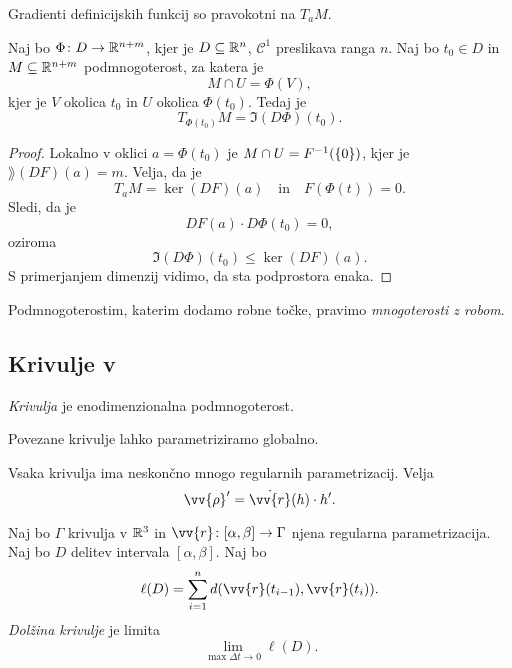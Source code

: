 \begin{opomba}
Gradienti definicijskih funkcij so pravokotni na $T_aM$.
\end{opomba}

\begin{posledica}
Naj bo $\Phi \colon D \to \mathbb{R}^{n+m}$, kjer je $D \subseteq \mathbb{R}^n$,
$\mathcal{C}^1$ preslikava ranga $n$. Naj bo $t_0 \in D$ in
$M \subseteq \mathbb{R}^{n+m}$ podmnogoterost, za katera je
\[
M \cap U = \Phi(V),
\]
kjer je $V$ okolica $t_0$ in $U$ okolica $\Phi(t_0)$. Tedaj je
\[
T_{\Phi(t_0)}M = \Im(D\Phi)(t_0).
\]
\end{posledica}

\begin{proof}
Lokalno v oklici $a = \Phi(t_0)$ je $M \cap U = F^{-1}(\left\{0\right\})$,
kjer je $\rang(DF)(a) = m$. Velja, da je
\[
T_aM = \ker(DF)(a)
\quad \text{in} \quad
F(\Phi(t)) = 0.
\]
Sledi, da je
\[
DF(a) \cdot D\Phi(t_0) = 0,
\]
oziroma
\[
\Im(D\Phi)(t_0) \leq \ker(DF)(a).
\]
S primerjanjem dimenzij vidimo, da sta podprostora enaka.
\end{proof}

\begin{opomba}
Podmnogoterostim, katerim dodamo robne točke, pravimo
\emph{mnogoterosti z robom}.
\end{opomba}

\newpage

\subsection{Krivulje v }

\begin{definicija}
\emph{Krivulja} je enodimenzionalna podmnogoterost.
\end{definicija}

\begin{trditev}
Povezane krivulje lahko parametriziramo globalno.
\end{trditev}

\begin{opomba}
Vsaka krivulja ima neskončno mnogo regularnih parametrizacij. Velja
\[
\vv{\rho}' = \dot{\vv{r}}(h) \cdot h'.
\]
\end{opomba}

\begin{definicija}
Naj bo $\Gamma$ krivulja v $\mathbb{R}^3$ in
$\vv{r} \colon [\alpha, \beta] \to \Gamma$ njena regularna
parametrizacija. Naj bo $D$ delitev intervala $[\alpha, \beta]$.
Naj bo
\[
\ell(D) =
\sum_{i=1}^n d(\vv{r}(t_{i-1}),\vv{r}(t_i)).
\]
\emph{Dolžina krivulje} je limita
\[
\lim_{\max \Delta t \to 0} \ell(D).
\]
\end{definicija}

